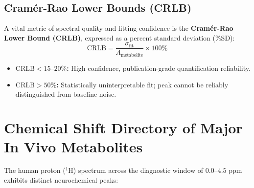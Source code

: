 \documentclass[11pt,a4paper]{article}
\begin{document}
\subsection{Cramér-Rao Lower Bounds (CRLB)}
A vital metric of spectral quality and fitting confidence is the \textbf{Cramér-Rao Lower Bound (CRLB)}, expressed as a percent standard deviation ($\% \text{SD}$):
\begin{equation}
    \text{CRLB} = \frac{\sigma_{\text{fit}}}{A_{\text{metabolite}}} \times 100\%
\end{equation}
\begin{itemize}
    \item \textbf{$\text{CRLB} < 15\text{--}20\%$:} High confidence, publication-grade quantification reliability.
    \item \textbf{$\text{CRLB} > 50\%$:} Statistically uninterpretable fit; peak cannot be reliably distinguished from baseline noise.
\end{itemize}

\section{Chemical Shift Directory of Major In Vivo Metabolites}
The human proton ($^1\text{H}$) spectrum across the diagnostic window of $0.0\text{--}4.5\text{ ppm}$ exhibits distinct neurochemical peaks:
\end{document}
